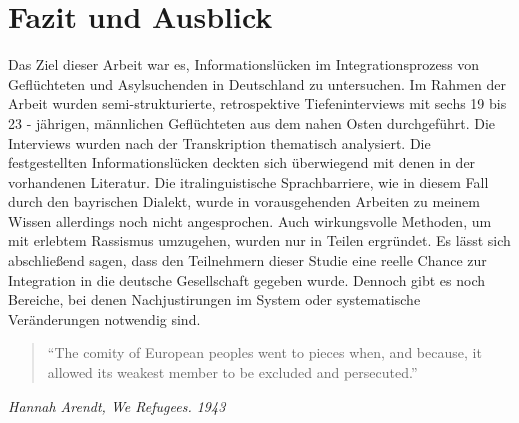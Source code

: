 \section{Fazit und Ausblick}

Das Ziel dieser Arbeit war es, Informationslücken im Integrationsprozess von Geflüchteten und Asylsuchenden in Deutschland zu untersuchen. Im Rahmen der Arbeit wurden semi-strukturierte, retrospektive Tiefeninterviews mit sechs 19 bis 23 - jährigen, männlichen Geflüchteten aus dem nahen Osten durchgeführt.\newline
Die Interviews wurden nach der Transkription thematisch analysiert.\newline
Die festgestellten Informationslücken deckten sich überwiegend mit denen in der vorhandenen Literatur. Die itralinguistische Sprachbarriere, wie in diesem Fall durch den bayrischen Dialekt, wurde in vorausgehenden Arbeiten zu meinem Wissen allerdings noch nicht angesprochen.\newline
Auch wirkungsvolle Methoden, um mit erlebtem Rassismus umzugehen, wurden nur in Teilen ergründet.\newline
Es lässt sich abschließend sagen, dass den Teilnehmern dieser Studie eine reelle Chance zur Integration in die deutsche Gesellschaft gegeben wurde. Dennoch gibt es noch Bereiche, bei denen Nachjustirungen im System oder systematische Veränderungen notwendig sind.

\begin{quote}
    ``The comity of European peoples went to pieces when, and because, it allowed its weakest member to be excluded and persecuted.''
\end{quote}
\centerline{\textit{Hannah Arendt, \textit{We Refugees}. 1943}}